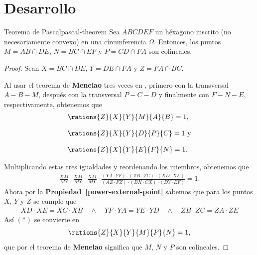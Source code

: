 \section{Desarrollo}



\begin{section-theorem.tcb}{Teorema de Pascal}{pascal-theorem}
    Sea $ABCDEF$ un héxagono inscrito (no necesariamente convexo) en una círcunferencia $\Omega$.
    Entonces, los puntos $M = AB \cap DE$, $N = BC \cap EF$ y $P = CD \cap FA$ son colineales.
\end{section-theorem.tcb}

\begin{proof}
    Sean $X = BC \cap DE$, $Y = DE \cap FA$ y $Z = FA \cap BC$.

    \begin{multicols}{2}
        \begin{figure}[H]
            \centering
            
        \end{figure}
        Al usar el teorema de \textbf{Menelao} tres veces en , primero con la transversal $A - B - M$, después con la transversal $P - C - D$ y finalmente con $F - N - E$, respectivamente, obtenemos que
        \begin{align*}
            &\rations{Z}{X}{Y}{M}{A}{B} = 1,\\[3mm]
            &\rations{Z}{X}{Y}{D}{P}{C} = 1\ \text{y}\\[3mm]
            &\rations{Z}{X}{Y}{E}{F}{N} = 1.
        \end{align*}
    \end{multicols}
    \vspace{-10mm}
    Multiplicando estas tres igualdades y reordenando los miembros, obtenemos que
    \begin{align*}
        \frac{XM}{MY} \cdot \frac{XM}{MY} \cdot \frac{XM}{MY} \cdot \frac{(YA\cdot YF) \cdot (ZB\cdot ZC) \cdot (XD\cdot XE)}{(AZ\cdot FZ) \cdot (BX \cdot CX) \cdot (DY\cdot EF)} = 1. \tag{$\ast$}
    \end{align*}
    Ahora por la \textbf{Propiedad~\ref{power-external-point}} sabemos que para los puntos $X$, $Y$ y $Z$ se cumple que
    \begin{align*}
        XD \cdot XE = XC \cdot XB \quad \land \quad
        YF \cdot YA = YE \cdot YD \quad \land \quad
        ZB \cdot ZC = ZA \cdot ZE
    \end{align*}
    Así $(\ast)$ se convierte en
    \[
        \rations{Z}{X}{Y}{M}{P}{N} = 1,
    \]
    que por el teorema de \textbf{Menelao} significa que $M$, $N$ y $P$ son colineales.
\end{proof}

